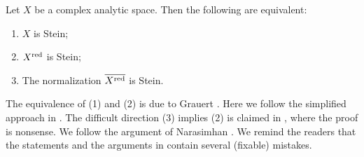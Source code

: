 \begin{corollary}\label{cor-Steinnorm}
    Let $X$ be a complex analytic space. Then the following are equivalent:
    \begin{enumerate}
        \item $X$ is Stein;
        \item $X^{\operatorname{red}}$ is Stein;
        \item The normalization $\overline{X^{\operatorname{red}}}$ is Stein.
    \end{enumerate}
\end{corollary}
The equivalence of (1) and  (2) is due to Grauert \cite{Gra60}. Here we follow the simplified approach in  \cite{GR77}.
The difficult direction (3) implies  (2) is claimed in \cite{GR77}, where the proof is nonsense. We follow the argument of Narasimhan \cite{Nar62}. We remind the readers that the statements and the arguments in \cite{Nar62} contain several (fixable) mistakes.

